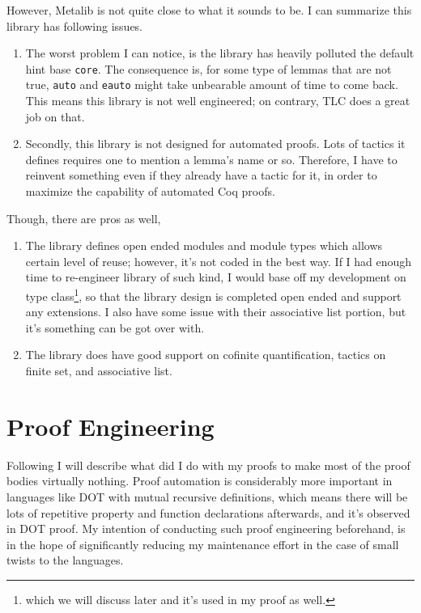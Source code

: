 \documentclass{article}
\theoremstyle{definition}
\begin{document}
\begin{enumerate}
  However, Metalib is not quite close to what it sounds to be. I can summarize this
  library has following issues.
  \begin{enumerate}
  \item The worst problem I can notice, is the library has heavily polluted the
    default hint base \texttt{core}. The consequence is, for some type of lemmas that
    are not true, \texttt{auto} and \texttt{eauto} might take unbearable amount of
    time to come back. This means this library is not well engineered; on contrary,
    TLC does a great job on that.
    
  \item Secondly, this library is not designed for automated proofs. Lots of tactics
    it defines requires one to mention a lemma's name or so. Therefore, I have to
    reinvent something even if they already have a tactic for it, in order to maximize
    the capability of automated Coq proofs.
  \end{enumerate}

  Though, there are pros as well,
  \begin{enumerate}
  \item The library defines open ended modules and module types which allows certain
    level of reuse; however, it's not coded in the best way. If I had enough time to
    re-engineer library of such kind, I would base off my development on type
    class\footnote{which we will discuss later and it's used in my proof as well.}, so
    that the library design is completed open ended and support any extensions. I also
    have some issue with their associative list portion, but it's something can be got
    over with.
    
  \item The library does have good support on cofinite quantification, tactics on
    finite set, and associative list.
  \end{enumerate}

\end{enumerate}

\section{Proof Engineering}

Following I will describe what did I do with my proofs to make most of the proof
bodies virtually nothing. Proof automation is considerably more important in languages
like DOT with mutual recursive definitions, which means there will be lots of
repetitive property and function declarations afterwards, and it's observed in DOT
proof. My intention of conducting such proof engineering beforehand, is in the hope of
significantly reducing my maintenance effort in the case of small twists to the
languages.
\end{document}

